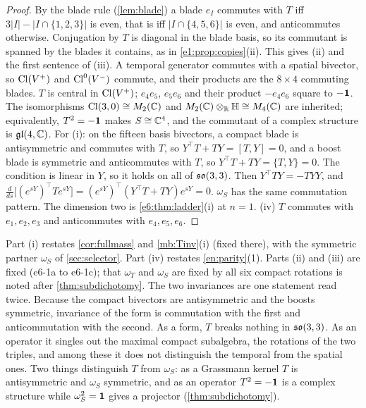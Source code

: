 \begin{proof}
By the blade rule (\cref{lem:blade}) a blade $e_I$ commutes with $T$ iff $3|I|-|I\cap\{1,2,3\}|$ is even, that is iff $|I\cap\{4,5,6\}|$ is even,
and anticommutes otherwise. Conjugation by $T$ is diagonal in the blade basis, so its commutant is spanned by the blades it contains, as in
\cref{e1:prop:copies}(ii). This gives (ii) and the first sentence of (iii). A temporal generator commutes with a spatial bivector, so
$\mathrm{Cl}(V^+)$ and $\mathrm{Cl}^0(V^-)$ commute, and their products are the $8\times4$ commuting blades. $T$ is central in $\mathrm{Cl}(V^+)$; $e_4e_5$, $e_5e_6$ and their product
$-e_4e_6$ square to $-\mathbf 1$. The isomorphisms $\mathrm{Cl}(3,0)\cong M_2(\mathbb{C})$ and $M_2(\mathbb{C})\otimes_{\mathbb{R}}\mathbb{H}\cong M_4(\mathbb{C})$ are inherited; equivalently, $T^2=-\mathbf 1$ makes
$S\cong\mathbb{C}^4$, and the commutant of a complex structure is $\mathfrak{gl}(4,\mathbb{C})$. For (i): on the fifteen basis bivectors, a compact blade is
antisymmetric and commutes with $T$, so $Y^{\!\top}T+TY=[T,Y]=0$, and a boost blade is symmetric and anticommutes with $T$, so
$Y^{\!\top}T+TY=\{T,Y\}=0$. The condition is linear in $Y$, so it holds on all of $\mathfrak{so}(3,3)$. Then $Y^{\!\top}TY=-TYY$, and
$\tfrac{d}{ds}\bigl[(e^{sY})^{\!\top}Te^{sY}\bigr]=(e^{sY})^{\!\top}(Y^{\!\top}T+TY)e^{sY}=0$. $\omega_S$ has the same commutation pattern. The dimension two is
\cref{e6:thm:ladder}(i) at $n=1$. (iv) $T$ commutes with $e_1,e_2,e_3$ and anticommutes with $e_4,e_5,e_6$.
\end{proof}

Part (i) restates \cref{cor:fullmass} and \cref{mb:Tinv}(i) (fixed there), with the symmetric partner $\omega_S$ of
\cref{sec:selector}. Part (iv) restates \cref{en:parity}(1). Parts (ii) and (iii) are fixed (e6-1a to e6-1c); that $\omega_T$ and
$\omega_S$ are fixed by all six compact rotations is noted after \cref{thm:subdichotomy}. The two invariances are one statement read twice.
Because the compact bivectors are antisymmetric and the boosts symmetric, invariance of the form is commutation with the first and
anticommutation with the second. As a form, $T$ breaks nothing in $\mathfrak{so}(3,3)$. As an operator it singles out the maximal compact subalgebra, the
rotations of the two triples, and among these it does not distinguish the temporal from the spatial ones. Two things distinguish $T$ from
$\omega_S$: as a Grassmann kernel $T$ is antisymmetric and $\omega_S$ symmetric, and as an operator $T^2=-\mathbf 1$ is a complex structure while
$\omega_S^2=\mathbf 1$ gives a projector (\cref{thm:subdichotomy}).

